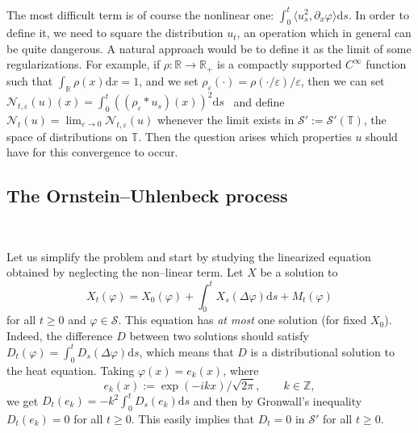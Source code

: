 \documentclass[a4paper,11pt]{article}
\newcommand{\assign}{:=}
\newcommand{\mathd}{\mathrm{d}}
\newcommand{\tmtextit}[1]{{\itshape{#1}}}
\newcommand{\CS}{\mathscr{S}}
\begin{document}
The most difficult term is of course the nonlinear one: $\int_0^t \langle
u^2_s, \partial_x \varphi \rangle \mathd s$. In order to define it, we need to
square the distribution $u_t$, an operation which in general can be quite
dangerous. A natural approach would be to define it as the limit of some
regularizations. For example, if $\rho : \mathbb{R} \rightarrow
\mathbb{R}_+$ is a compactly supported $C^{\infty}$ function such that
$\int_{\mathbb{R}} \rho (x) \mathd x = 1$, and we set $\rho_{\varepsilon}
(\cdot) = \rho (\cdot / \varepsilon) / \varepsilon$, then we can set
$\mathcal{N}_{t, \varepsilon} (u) (x) = \int_0^t ((\rho_{\varepsilon} \ast
u_s) (x))^2 \mathd s$ \ and define $\mathcal{N}_t (u) = \lim_{\varepsilon
\rightarrow 0} \mathcal{N}_{t, \varepsilon} (u)$ whenever the limit exists in
$\CS' \assign \CS' (\mathbb{T})$, the space of distributions on
$\mathbb{T}$. Then the question arises which properties $u$ should have for
this convergence to occur.

\subsection{The Ornstein--Uhlenbeck process}

\

Let us simplify the problem and start by studying the linearized equation
obtained by neglecting the non--linear term. Let $X$ be a solution to
\begin{equation}
  X_t (\varphi) = X_0 (\varphi) + \int_0^t X_s (\Delta \varphi) \mathd s + M_t
  (\varphi) \label{eq:ou-weak}
\end{equation}
for all $t \geqslant 0$ and $\varphi \in \CS$. This equation has \tmtextit{at
most} one solution (for fixed $X_0$). Indeed, the difference $D$ between two
solutions should satisfy $D_t (\varphi) = \int_0^t D_s (\Delta \varphi) \mathd
s$, which means that $D$ is a distributional solution to the heat equation.
Taking $\varphi (x) = e_k (x)$, where
\[ e_k (x) \assign \exp (- i kx) / \sqrt{2 \pi}, \hspace{2em} k \in
   \mathbb{Z}, \]
we get $D_t (e_k) = - k^2 \int_0^t D_s (e_k) \mathd s$ and then by Gronwall's
inequality $D_t (e_k) = 0$ for all $t \geqslant 0$. This easily implies that
$D_t = 0$ in $\CS'$ for all $t \geqslant 0$.
\end{document}
